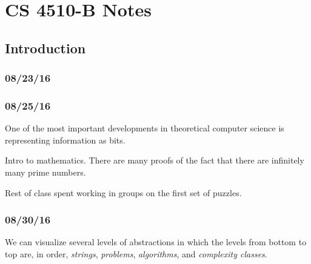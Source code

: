 \documentclass[a4paper,12pt]{article}
\theoremstyle{remark}
\theoremstyle{definition}
\begin{document}
\section*{CS 4510-B Notes}


\subsection*{Introduction}

\subsubsection*{08/23/16}
\subsubsection*{08/25/16}
One of the most important developments in theoretical computer science is representing information as bits. \par
Intro to mathematics. There are many proofs of the fact that there are infinitely many prime numbers. \par
Rest of class spent working in groups on the first set of puzzles.
\subsubsection*{08/30/16}
We can visualize several levels of abstractions in which the levels from bottom to top are, in order, \emph{strings}, \emph{problems}, \emph{algorithms}, and \emph{complexity classes}. \par
\end{document}
